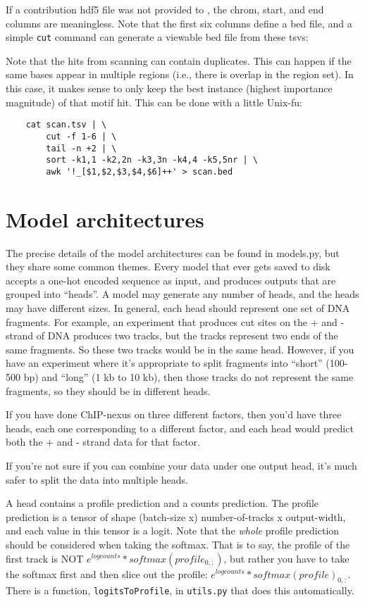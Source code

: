 \documentclass{article}
\begin{document}
If a contribution hdf5 file was not provided to , the chrom, start,
and end columns are meaningless.
Note that the first six columns define a bed file, and a simple \texttt{cut}
command can generate a viewable bed file from these tsvs:



Note that the hits from scanning can contain duplicates. This can happen if the same bases
appear in multiple regions (i.e., there is overlap in the region set). In this case, it makes
sense to only keep the best instance (highest importance magnitude) of that motif hit.
This can be done with a little Unix-fu:

\begin{lstlisting}
    cat scan.tsv | \
        cut -f 1-6 | \
        tail -n +2 | \
        sort -k1,1 -k2,2n -k3,3n -k4,4 -k5,5nr | \
        awk '!_[$1,$2,$3,$4,$6]++' > scan.bed
\end{lstlisting}
\newpage
\section{Model architectures}\label{sec:modelArchitectures}

The precise details of the model architectures can be found in models.py, but they share some
common themes.
Every model that ever gets saved to disk accepts a one-hot encoded sequence as input, and produces
outputs that are grouped into ``heads''.
A model may generate any number of heads, and the heads may have different sizes.
In general, each head should represent one set of DNA fragments. For example, an experiment that
produces cut sites on the + and - strand of DNA produces two tracks, but the tracks represent two
ends of the same fragments. So these two tracks would be in the same head.
However, if you have an experiment where it's appropriate to split fragments into ``short''
(100-500 bp) and ``long'' (1 kb to 10 kb), then those tracks do not represent the same
fragments, so they should be in different heads.

If you have done ChIP-nexus on three different factors, then you'd have three heads, each one
corresponding to a different factor, and each head would predict both the + and - strand data
for that factor.

If you're not sure if you can combine your data under one output head, it's much safer to split
the data into multiple heads.

A head contains a profile prediction and a counts prediction. The profile prediction is a tensor
of shape (batch-size x) number-of-tracks x output-width, and each value in this tensor is a logit.
Note that the \emph{whole} profile prediction should be considered when taking the softmax.
That is to say, the profile of the first track is NOT $e^{logcounts} * softmax(profile_{0,:})$,
but rather you have to take the softmax first and then slice out the profile:
$e^{logcounts} * softmax(profile)_{0,:}$. There is a function, \texttt{logitsToProfile}, in
\texttt{utils.py} that does this automatically.
\end{document}
